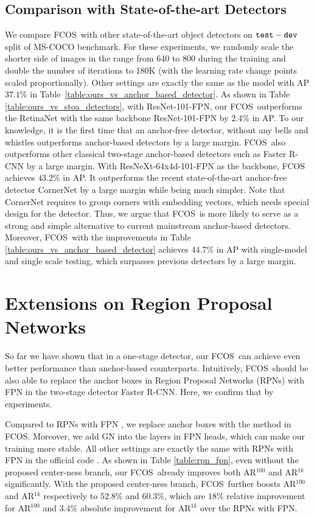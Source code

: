 \documentclass[10pt,twocolumn,letterpaper]{article}
\renewcommand{\texttt}[1]{ $ {{\tt #1} } $}
\newcommand{\1}{{\mathbbm{1}}}           %
\def\Ours{{FCNDet}\xspace}
\def\Ours{{FCOS}\xspace}
\begin{document}
\subsection{Comparison with State-of-the-art Detectors}
We compare \Ours\ with other state-of-the-art object detectors on \texttt{test-dev} split of MS-COCO benchmark. For these experiments, we randomly scale the shorter side of images in the range from 640 to 800 during the training and double the number of iterations to 180K (with the learning rate change points scaled proportionally). Other settings are exactly the same as the model with AP $37.1\%$ in Table~\ref{table:ours_vs_anchor_based_detector}. As shown in Table \ref{table:ours_vs_stoa_detectors}, with ResNet-101-FPN, our \Ours\ outperforms the RetinaNet with the same backbone ResNet-101-FPN by $2.4\%$ in AP. To our 
%
%
%
knowledge, it is the first time that an anchor-free detector, without any bells and whistles outperforms anchor-based detectors by a large margin. \Ours\ also outperforms other classical two-stage anchor-based detectors such as Faster R-CNN by a large margin. With ResNeXt-64x4d-101-FPN \cite{xie2017aggregated} as the backbone, \Ours achieves $43.2\%$ in AP. It outperforms the recent state-of-the-art anchor-free detector CornerNet \cite{law2018cornernet} by a large margin while being much simpler. Note that CornerNet requires to group corners with embedding vectors, which needs special design for the detector. Thus, we argue that \Ours\ is more likely to serve as a strong and simple alternative to current mainstream anchor-based detectors. Moreover, \Ours\ with the improvements in Table \ref{table:ours_vs_anchor_based_detector} achieves $44.7\%$ in AP with single-model and single scale testing, which surpasses previous detectors by a large margin.


\section{Extensions on Region Proposal Networks}
So far we have shown that in a one-stage detector, our \Ours\ can achieve even better performance than anchor-based counterparts. Intuitively, \Ours\ should be also able to replace the anchor boxes in Region Proposal Networks (RPNs) with FPN \cite{lin2017feature} in the two-stage detector Faster R-CNN. Here, we confirm that by experiments.

Compared to RPNs with FPN \cite{lin2017feature}, we replace anchor boxes with the method in \Ours. Moreover, we add GN into the layers in FPN heads, which can make our training more stable. All other settings are exactly the same with RPNs with FPN in the official code \cite{Detectron2018}. As shown in Table \ref{table:rpn_fpn}, even without the proposed center-ness branch, our \Ours\ already improves both AR$^{100}$ and AR$^{1k}$ significantly. With the proposed center-ness branch, \Ours\ further boosts AR$^{100}$ and AR$^{1k}$ respectively to $52.8\%$ and $60.3\%$, which are $18\%$ relative improvement for AR$^{100}$ and $3.4\%$ absolute improvement for AR$^{1k}$ over the RPNs with FPN.
\end{document}
